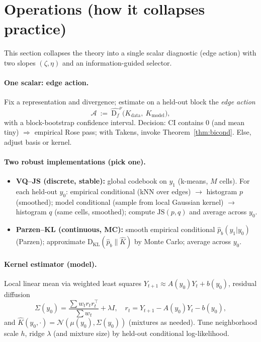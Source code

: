 \documentclass[11pt]{article}
\newcommand{\KL}{\mathrm{D}_{\mathrm{KL}}}
\newcommand{\Df}{\mathrm{D}_f}
\newcommand{\1}{\mathbf{1}}
\begin{document}
\section{Operations (how it collapses practice)}
This section collapses the theory into a single scalar diagnostic (edge action) with two slopes $(\zeta,\eta)$ and an information-guided selector.

\paragraph{One scalar: edge action.}
Fix a representation and divergence; estimate on a held-out block the \emph{edge action}
\[
\mathcal A\ :=\ \widehat{\Df}^{\nu}\!\big(K_{\text{data}},\ K_{\text{model}}\big),
\]
with a block-bootstrap confidence interval. Decision: CI contains \(0\) (and mean tiny) \(\Rightarrow\) empirical Rose pass; with Takens, invoke Theorem~\ref{thm:bicond}. Else, adjust basis or kernel.

\paragraph{Two robust implementations (pick one).}
\begin{itemize}[leftmargin=1.7em,itemsep=2pt,topsep=2pt]
\item \textbf{VQ--JS (discrete, stable):} global codebook on \(y_1\) (k-means, \(M\) cells). For each held-out \(y_0\):
empirical conditional (kNN over edges) \(\to\) histogram \(p\) (smoothed);
model conditional (sample from local Gaussian kernel) \(\to\) histogram \(q\) (same cells, smoothed);
compute \(\mathrm{JS}(p,q)\) and average across \(y_0\).
\item \textbf{Parzen--KL (continuous, MC):} smooth empirical conditional \(\hat p_b(y_1|y_0)\) (Parzen); approximate \(\KL(\hat p_b\|\hat K)\) by Monte Carlo; average across \(y_0\).
\end{itemize}

\paragraph{Kernel estimator (model).}
Local linear mean via weighted least squares \(Y_{t+1}\approx A(y_0)Y_t+b(y_0)\), residual diffusion
\[
\Sigma(y_0)=\frac{\sum w_t r_t r_t^\top}{\sum w_t}+\lambda I,\quad r_t=Y_{t+1}-A(y_0)Y_t-b(y_0),
\]
and \(\hat K(y_0,\cdot)=\mathcal N(\mu(y_0),\Sigma(y_0))\) (mixtures as needed).
Tune neighborhood scale \(h\), ridge \(\lambda\) (and mixture size) by held-out conditional log-likelihood.
\end{document}
